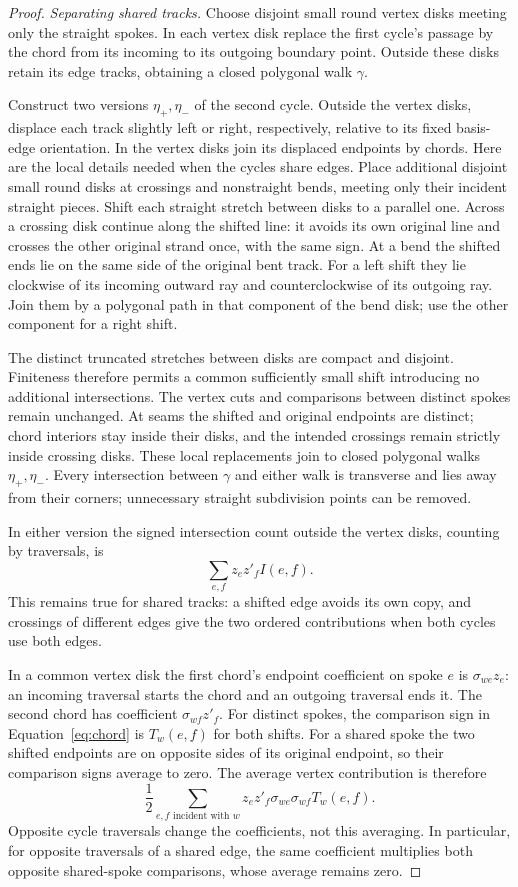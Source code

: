 \documentclass[11pt,a4paper]{article}
\theoremstyle{remark}
\numberwithin{equation}{section}
\begin{document}
\begin{proof}
\emph{Separating shared tracks.} Choose disjoint small round vertex disks
meeting only the straight spokes. In each vertex disk replace the first cycle's passage by the
chord from its incoming to its outgoing boundary point. Outside
these disks retain its edge tracks, obtaining a closed polygonal
walk \(\gamma\).

Construct two versions \(\eta_+,\eta_-\) of the second cycle.
Outside the vertex disks, displace each track slightly left or right,
respectively, relative to its fixed basis-edge orientation. In the
vertex disks join its displaced endpoints by chords. Here are the
local details needed when the cycles share edges. Place additional
disjoint small round disks at crossings and nonstraight bends,
meeting only their incident straight pieces. Shift each straight
stretch between disks to a parallel one. Across a crossing disk
continue along the shifted line: it avoids its own original line
and crosses the other original strand once, with the same sign.
At a bend the shifted ends lie on the same side of the original
bent track. For a left shift they lie clockwise of its incoming
outward ray and counterclockwise of its outgoing ray. Join them
by a polygonal path in that component of the bend disk; use the
other component for a right shift.

The distinct truncated stretches between disks are compact and
disjoint. Finiteness therefore permits a common sufficiently small
shift introducing no additional intersections. The vertex cuts and
comparisons between distinct spokes remain unchanged. At seams the
shifted and original endpoints are distinct; chord interiors stay
inside their disks, and the intended crossings remain strictly
inside crossing disks. These local replacements join to closed
polygonal walks \(\eta_+,\eta_-\). Every intersection between
\(\gamma\) and either walk is transverse and lies away from their
corners; unnecessary straight subdivision points can be removed.

In either version the signed intersection count outside the vertex
disks, counting by traversals, is
\[
\sum_{e,f}z_ez'_f I(e,f).
\]
This remains true for shared tracks: a shifted edge avoids its own
copy, and crossings of different edges give the two ordered
contributions when both cycles use both edges.

In a common vertex disk the first chord's endpoint coefficient on
spoke \(e\) is \(\sigma_{we}z_e\): an incoming traversal starts the
chord and an outgoing traversal ends it. The second chord has
coefficient \(\sigma_{wf}z'_f\). For distinct spokes, the comparison
sign in Equation~\eqref{eq:chord} is \(T_w(e,f)\) for both shifts.
For a shared spoke the two shifted endpoints are on opposite sides
of its original endpoint, so their comparison signs average to zero.
The average vertex contribution is therefore
\[
\frac12\sum_{e,f\text{ incident with }w}
z_ez'_f\sigma_{we}\sigma_{wf}T_w(e,f).
\]
Opposite cycle traversals change the coefficients, not this averaging.
In particular, for opposite traversals of a shared edge, the same
coefficient multiplies both opposite shared-spoke comparisons,
whose average remains zero.


\end{proof}
\end{document}
